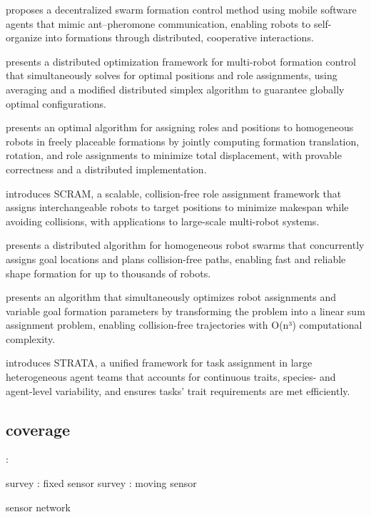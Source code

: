 \cite{kambayashi2018distributed} proposes a decentralized swarm formation control method using mobile software agents that mimic ant–pheromone communication, enabling robots to self-organize into formations through distributed, cooperative interactions.

\cite{montijano2014efficient} presents a distributed optimization framework for multi-robot formation control that simultaneously solves for optimal positions and role assignments, using averaging and a modified distributed simplex algorithm to guarantee globally optimal configurations.

\cite{mosteo2017optimal} presents an optimal algorithm for assigning roles and positions to homogeneous robots in freely placeable formations by jointly computing formation translation, rotation, and role assignments to minimize total displacement, with provable correctness and a distributed implementation.

\cite{macalpine2015scram} introduces SCRAM, a scalable, collision-free role assignment framework that assigns interchangeable robots to target positions to minimize makespan while avoiding collisions, with applications to large-scale multi-robot systems.

\cite{wang2020shape} presents a distributed algorithm for homogeneous robot swarms that concurrently assigns goal locations and plans collision-free paths, enabling fast and reliable shape formation for up to thousands of robots.

\cite{agarwal2018simultaneous} presents an algorithm that simultaneously optimizes robot assignments and variable goal formation parameters by transforming the problem into a linear sum assignment problem, enabling collision-free trajectories with O(n³) computational complexity.

\cite{ravichandar2020strata} introduces STRATA, a unified framework for task assignment in large heterogeneous agent teams that accounts for continuous traits, species- and agent-level variability, and ensures tasks' trait requirements are met efficiently.


\subsection{coverage}:

\cite{wang2011coverage} survey : fixed sensor
\cite{galceran2013survey} survey : moving sensor

sensor network
\cite{luo2018adaptive}
\cite{santos2019decentralized}
\cite{siligardi2019robust}

